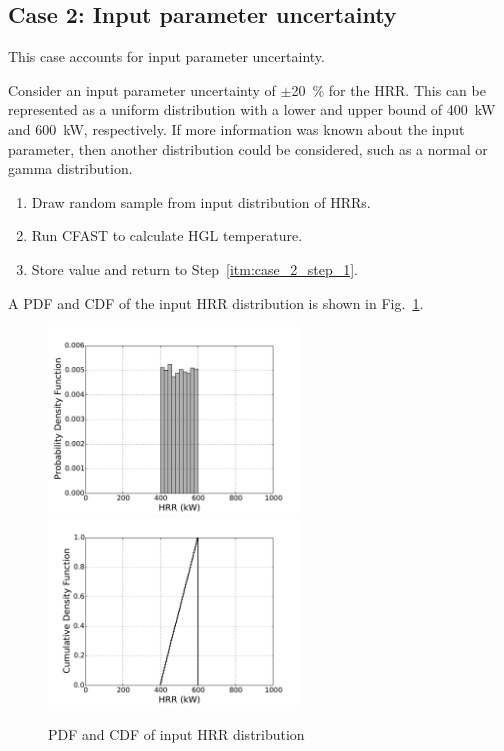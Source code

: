 \documentclass[12pt]{article}
\begin{document}
\clearpage


\subsection{Case 2: Input parameter uncertainty}

This case accounts for input parameter uncertainty.

Consider an input parameter uncertainty of $\pm$20~\% for the HRR. This can be represented as a uniform distribution with a lower and upper bound of 400~kW and 600~kW, respectively. If more information was known about the input parameter, then another distribution could be considered, such as a normal or gamma distribution.

\begin{enumerate}
\item Draw random sample from input distribution of HRRs.
\label{itm:case_2_step_1}
\item Run CFAST to calculate HGL temperature.
\item Store value and return to Step~\ref{itm:case_2_step_1}.
\end{enumerate}


\clearpage


A PDF and CDF of the input HRR distribution is shown in Fig.~\ref{fig:case_2_input_distributions}.

\begin{figure}[!ht]
\includegraphics[width=2.6in]{Figures/input_PDF}
\includegraphics[width=2.6in]{Figures/input_CDF}
\caption{PDF and CDF of input HRR distribution}
\label{fig:case_2_input_distributions}
\end{figure}
\end{document}
